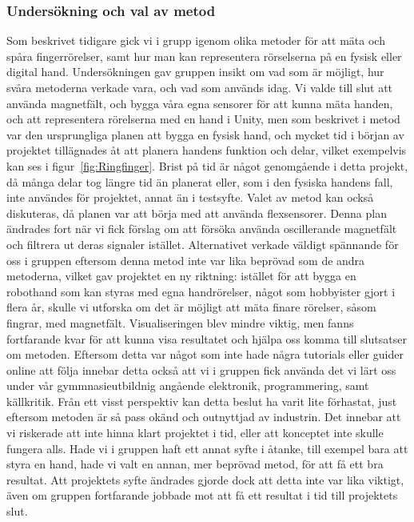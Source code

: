 \documentclass[a4paper]{article}
\makeatletter
\let\\\@raggedtwoe@savedcr%
\makeatother
\begin{document}
\begin{sloppypar}
    \subsubsection{Undersökning och val av metod}
    Som beskrivet tidigare gick vi i grupp igenom olika metoder för att mäta och spåra fingerrörelser, samt hur man kan representera rörselserna på en fysisk eller digital hand.
    Undersökningen gav gruppen insikt om vad som är möjligt, hur svåra metoderna verkade vara, och vad som används idag.
    Vi valde till slut att använda magnetfält, och bygga våra egna sensorer för att kunna mäta handen, och att representera rörelserna med en hand i Unity, men som beskrivet i metod var den ursprungliga planen att bygga en fysisk hand, och mycket tid i början av projektet tillägnades åt att planera handens funktion och delar, vilket exempelvis kan ses i figur~\ref{fig:Ringfinger}.
    Brist på tid är något genomgående i detta projekt, då många delar tog längre tid än planerat eller, som i den fysiska handens fall, inte användes för projektet, annat än i testsyfte.
    \\\\
    Valet av metod kan också diskuteras, då planen var att börja med att använda flexsensorer. Denna plan ändrades fort när vi fick förslag om att försöka använda oscillerande magnetfält och filtrera ut deras signaler istället.
    Alternativet verkade väldigt spännande för oss i gruppen eftersom denna metod inte var lika beprövad som de andra metoderna, vilket gav projektet en ny riktning: istället för att bygga en robothand som kan styras med egna handrörelser, något som hobbyister gjort i flera år, skulle vi utforska om det är möjligt att mäta finare rörelser, såsom fingrar, med magnetfält.
    Visualiseringen blev mindre viktig, men fanns fortfarande kvar för att kunna visa resultatet och hjälpa oss komma till slutsatser om metoden.
    Eftersom detta var något som inte hade några tutorials eller guider online att följa innebar detta också att vi i gruppen fick använda det vi lärt oss under vår gymmnasieutbildnig angående elektronik, programmering, samt källkritik.
    Från ett visst perspektiv kan detta beslut ha varit lite förhastat, just eftersom metoden är så pass okänd och outnyttjad av industrin. Det innebar att vi riskerade att inte hinna klart projektet i tid, eller att konceptet inte skulle fungera alls.
    Hade vi i gruppen haft ett annat syfte i åtanke, till exempel bara att styra en hand, hade vi valt en annan, mer beprövad metod, för att få ett bra resultat.
    Att projektets syfte ändrades gjorde dock att detta inte var lika viktigt, även om gruppen fortfarande jobbade mot att få ett resultat i tid till projektets slut.


\end{sloppypar}
\end{document}
